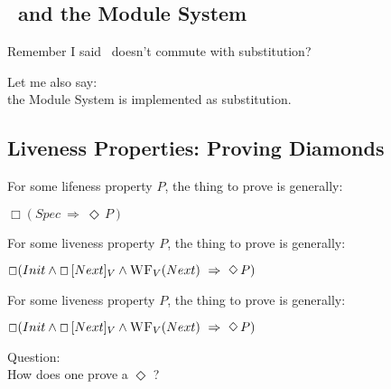 \subsection{\enabled\ and the Module System}
{
Remember I said \enabled\ doesn't commute with substitution?
\vspace{45pt}

Let me also say: \\
\hfill
 the Module System is implemented as   substitution. 

\vspace{45pt}
}

\subsection{Liveness Properties: Proving Diamonds}
{
For some lifeness property $P$,  the thing to prove is generally:
\vspace{25pt}
\begin{theorem}[Liveness]
\begin{center}
$ \Box (Spec\ \Rightarrow\  \Diamond\, P) $
\end{center}
\end{theorem}

\vspace{75pt}
}

{
For some liveness property $P$,  the thing to prove is generally:
\vspace{25pt}
\begin{theorem}[Liveness]
\begin{center}
$\Box (Init \wedge \Box\, [Next]_V  \wedge \textsc{WF}_V (Next) \  \Rightarrow \ \Diamond\, P)$
\end{center}
\end{theorem}

\vspace{75pt}
}



{
For some liveness property $P$,  the thing to prove is generally:
\vspace{25pt}
\begin{theorem}[Liveness]
\begin{center}
$\Box (Init \wedge \Box\, [Next]_V  \wedge \textsc{WF}_V (Next) \  \Rightarrow \ \Diamond\, P)$
\end{center}
\end{theorem}
\vspace{20pt}
{\color{Maroon} Question:} \\
\hfill How does one prove a $\Diamond$ ?
\vspace{27pt}
}

